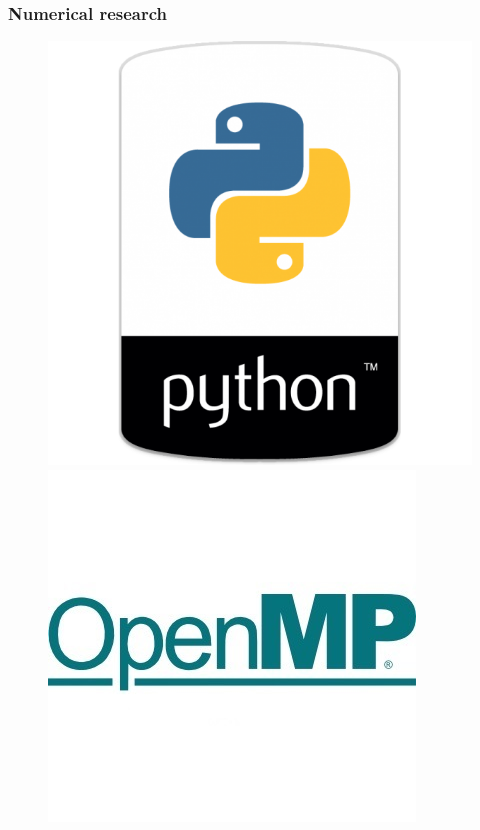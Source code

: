\documentclass[fullscreen=true, unicode, bookmarks=false]{beamer}
\begin{document}
\begin{frame}
\frametitle{ Numerical research } 

\begin{figure} 
\includegraphics[scale=0.25]{python.png}  
\hfill
\includegraphics[scale=0.6]{openmp.jpg} 
\end{figure}

\end{frame}
\end{document}
